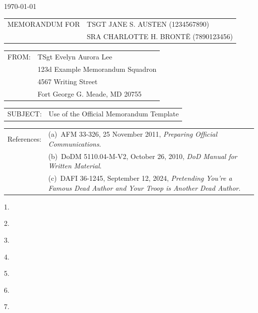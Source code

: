\documentclass[12pt]{article}
\newlength{\extraSpaceLength}
\newcommand{\setcolumnwidth}[2]{
    \newlength{#1}%
    \settowidth{#1}{#2}%
    \addtolength{#1}{\extraSpaceLength} %
}
\begin{document}
\pagestyle{default}
\thispagestyle{firstpage}


\noindent\hfill\monthyeardate\today


\setcolumnwidth{\memoWidth}{MEMORANDUM FOR}
\noindent
\begin{tabularx}{\textwidth}{@{} p{\memoWidth} @{} X @{}} 
MEMORANDUM FOR & TSGT JANE S. AUSTEN (1234567890)\\
               & SRA CHARLOTTE H. BRONTË (7890123456)\\
\end{tabularx}

\setcolumnwidth{\fromWidth}{FROM:}
\noindent
\begin{tabularx}{\textwidth}{@{} p{\fromWidth} @{} X @{}} 
FROM: & TSgt Evelyn Aurora Lee\\
      & 123d Example Memorandum Squadron\\
      & 4567 Writing Street\\
      & Fort George G. Meade, MD 20755\\
\end{tabularx}

\setcolumnwidth{\subjectWidth}{SUBJECT:}
\noindent
\begin{tabularx}{\textwidth}{@{} p{\subjectWidth} @{} X @{}} 
SUBJECT: & Use of the Official Memorandum Template\\
\end{tabularx}

\setcolumnwidth{\referencesWidth}{References:}
\noindent
\begin{tabularx}{\textwidth}{@{} p{} @{} X @{}} 
References: & (a)~AFM 33-326, 25 November 2011, \textit{Preparing Official Communications}.\\
            & (b)~DoDM 5110.04-M-V2, October 26, 2010, \textit{DoD Manual for Written Material}.\\
            & (c)~DAFI 36-1245, September 12, 2024, \textit{Pretending You're a Famous Dead Author and Your Troop is Another Dead Author}.\\
\end{tabularx}

1.~\lipsum[1]

2.~\lipsum[1]

3.~\lipsum[1]

4.~\lipsum[1]

5.~\lipsum[1]

6.~\lipsum[1]

7.~\lipsum[1]

\end{document}

